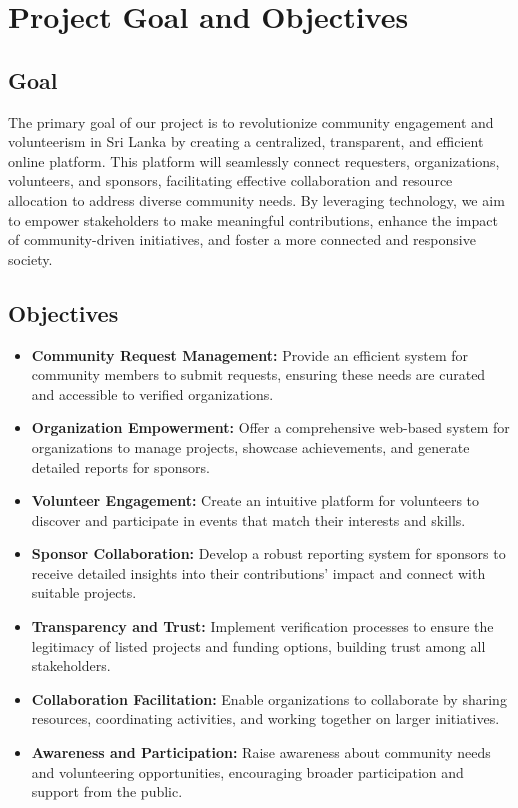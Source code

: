 \section{Project Goal and Objectives}
\subsection{Goal}
The primary goal of our project is to revolutionize community engagement and volunteerism in Sri Lanka by creating a centralized, transparent, and efficient online platform. This platform will seamlessly connect requesters, organizations, volunteers, and sponsors, facilitating effective collaboration and resource allocation to address diverse community needs. By leveraging technology, we aim to empower stakeholders to make meaningful contributions, enhance the impact of community-driven initiatives, and foster a more connected and responsive society.



\subsection{Objectives}
\begin{itemize}
	\item \textbf{Community Request Management:} Provide an efficient system for community members to submit requests, ensuring these needs are curated and accessible to verified organizations.
      
	\item \textbf{Organization Empowerment:} Offer a comprehensive web-based system for organizations to manage projects, showcase achievements, and generate detailed reports for sponsors.
 
	\item \textbf{Volunteer Engagement:} Create an intuitive platform for volunteers to discover and participate in events that match their interests and skills.

	\item \textbf{Sponsor Collaboration:} Develop a robust reporting system for sponsors to receive detailed insights into their contributions' impact and connect with suitable projects.
	      
	\item \textbf{Transparency and Trust:} Implement verification processes to ensure the legitimacy of listed projects and funding options, building trust among all stakeholders.
 
	\item \textbf{Collaboration Facilitation:} Enable organizations to collaborate by sharing resources, coordinating activities, and working together on larger initiatives.

        \item \textbf{Awareness and Participation:} Raise awareness about community needs and volunteering opportunities, encouraging broader participation and support from the public.
 

	
\end{itemize}